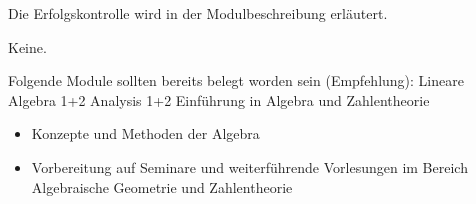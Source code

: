 \begin{course}

\setdoclanguagegerman
{}


\courselevel{}
\courseinstructionlanguage{}

\coursehead


\label{cour_7973.dp_997}


\begin{styleenv}
\begin{assessment}
Die Erfolgskontrolle wird in der Modulbeschreibung erläutert.


\end{assessment}

\begin{conditions}Keine.\end{conditions}

\begin{recommendations}Folgende Module sollten bereits belegt worden sein (Empfehlung):\newline
Lineare Algebra 1+2\newline
Analysis 1+2\newline
Einführung in Algebra und Zahlentheorie

\end{recommendations}
\end{styleenv}

\begin{learningoutcomes}
\begin{itemize}\item Konzepte und Methoden der Algebra  \item Vorbereitung auf Seminare und weiterführende Vorlesungen im Bereich Algebraische Geometrie und Zahlentheorie  \end{itemize}
\end{learningoutcomes}


\end{course}
